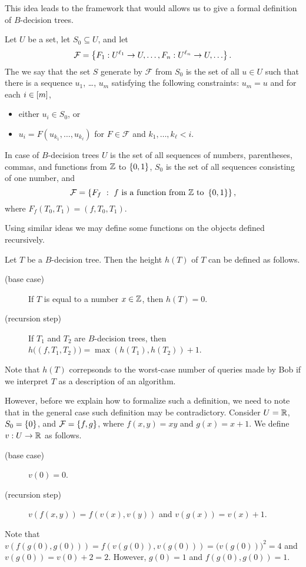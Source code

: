 This idea leads to the framework that would allows us to give a formal
definition of $B$-decision trees.
\begin{definition}
  Let $U$ be a set, let $S_0 \subseteq U$, and let
  \[
    \mathcal{F} =
    \set{F_1 : U^{\ell_1} \to U, \dots, F_n : U^{\ell_n} \to U, \dots}.
  \]
  The we say that the set $S$ generate by $\mathcal{F}$ from $S_0$ is
  the set of all $u \in U$ such that there is a sequence
  $u_1$, \dots, $u_m$ satisfying the following constraints: $u_m = u$ and
  for each $i \in {[{m}]}$,
  \begin{itemize}
    \item either $u_i \in S_0$, or
    \item $u_i = F(u_{k_1}, \dots, u_{k_\ell})$
      for $F \in \mathcal{F}$ and $k_1, \dots, k_\ell < i$.
  \end{itemize}
\end{definition}
In case of $B$-decision trees $U$ is the set of all sequences of numbers,
parentheses, commas, and functions from ${\mathbb{Z}}$ to $\set{0, 1}$,
$S_0$ is the set of all sequences consisting of one number, and
\[
  \mathcal{F} =
  \set[
    {
      f \text{ is a function from } \Z
        \text{ to } \set{0, 1}
    }
  ]{F_f},
\]
where $F_f(T_0, T_1) = (f, T_0, T_1)$.

Using similar ideas we may define some functions on the objects defined
recursively.
\begin{definition}
  Let $T$ be a $B$-decision tree. Then the height $h(T)$ of $T$ can be
  defined as follows.
  \begin{description}
    \item [(base case)] If $T$ is equal to a number $x \in {\mathbb{Z}}$, then $h(T) = 0$.
    \item[(recursion step)] If $T_1$ and $T_2$ are $B$-decision trees, then
      $h\big((f, T_1, T_2)\big) = \max(h(T_1), h(T_2)) + 1$.
  \end{description}
\end{definition}
Note that $h(T)$ correpsonds to the worst-case number of queries made by Bob if
we interpret $T$ as a description of an algorithm.

However, before we explain how to formalize such a definition, we need to note
that in the general case such definition may be contradictory. Consider
$U = {\mathbb{R}}$, $S_0 = \set{0}$, and $\mathcal{F} = \set{f, g}$, where $f(x, y) = xy$
and $g(x) = x + 1$. We define $v : U \to {\mathbb{R}}$ as follows.
\begin{description}
  \item [(base case)] $v(0) = 0$.
  \item[(recursion step)] $v(f(x, y)) = f(v(x), v(y))$ and
    $v(g(x)) = v(x) + 1$.
\end{description}
Note that $v(f(g(0), g(0))) = f(v(g(0)), v(g(0))) = \big(v(g(0))\big)^2 = 4$
and $v(g(0)) = v(0) + 2 = 2$.
However, $g(0) = 1$ and $f(g(0), g(0)) = 1$.

